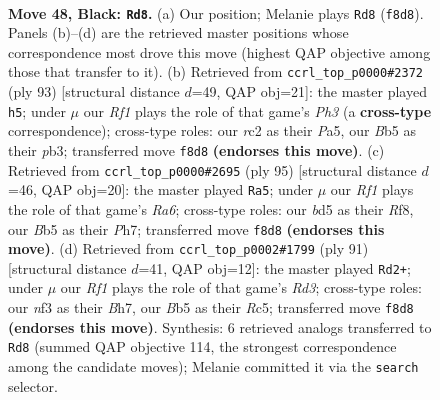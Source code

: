 \documentclass[11pt]{article}
\begin{document}
\clearpage

\begin{figure}[p]\centering
\begin{subfigure}{0.46\textwidth}\centering
\resizebox{\linewidth}{!}{%
\newchessgame
\chessboard[
  setfen={1k3r2/8/8/1b1B1p1N/1P5R/4rN2/2R3P1/3K4 b - - 12 48},
  showmover=false,
  pgfstyle=straightmove, color=movearrow, markmove={f8-d8}
]}
\caption{}
\end{subfigure}\hfill
\begin{subfigure}{0.46\textwidth}\centering
\resizebox{\linewidth}{!}{%
\newchessgame
\chessboard[
  setfen={8/8/6rp/p1P2k2/8/1P1K2b1/P3RN2/8 b - - 1 47},
  showmover=false,
  pgfstyle=straightmove, color=movearrow, markmove={h6-h5}
]}
\caption{}
\end{subfigure}
\\[4pt]
\begin{subfigure}{0.46\textwidth}\centering
\resizebox{\linewidth}{!}{%
\newchessgame
\chessboard[
  setfen={5r1k/7p/4Rb2/7P/5PR1/r7/4N1K1/8 b - - 4 48},
  showmover=false,
  pgfstyle=straightmove, color=movearrow, markmove={a3-a5}
]}
\caption{}
\end{subfigure}\hfill
\begin{subfigure}{0.46\textwidth}\centering
\resizebox{\linewidth}{!}{%
\newchessgame
\chessboard[
  setfen={8/1p3R1b/3r3k/2r5/P3p3/4N1RP/7K/8 b - - 0 46},
  showmover=false,
  pgfstyle=straightmove, color=movearrow, markmove={d6-d2}
]}
\caption{}
\end{subfigure}
\caption{\textbf{Move 48, Black: \texttt{Rd8}.} (a) Our position; Melanie plays \texttt{Rd8} (\texttt{f8d8}). Panels (b)--(d) are the retrieved master positions whose correspondence most drove this move (highest QAP objective among those that transfer to it). (b) Retrieved from \texttt{ccrl\_top\_p0000\#2372} (ply 93) [structural distance $d$=49, QAP obj=21]: the master played \texttt{h5}; under $\mu$ our \emph{Rf1} plays the role of that game's \emph{Ph3} (a \textbf{cross-type} correspondence); cross-type roles: our \emph{r}c2 as their \emph{P}a5, our \emph{B}b5 as their \emph{p}b3; transferred move \texttt{f8d8} \textbf{(endorses this move)}. (c) Retrieved from \texttt{ccrl\_top\_p0000\#2695} (ply 95) [structural distance $d$=46, QAP obj=20]: the master played \texttt{Ra5}; under $\mu$ our \emph{Rf1} plays the role of that game's \emph{Ra6}; cross-type roles: our \emph{b}d5 as their \emph{R}f8, our \emph{B}b5 as their \emph{P}h7; transferred move \texttt{f8d8} \textbf{(endorses this move)}. (d) Retrieved from \texttt{ccrl\_top\_p0002\#1799} (ply 91) [structural distance $d$=41, QAP obj=12]: the master played \texttt{Rd2+}; under $\mu$ our \emph{Rf1} plays the role of that game's \emph{Rd3}; cross-type roles: our \emph{n}f3 as their \emph{B}h7, our \emph{B}b5 as their \emph{R}c5; transferred move \texttt{f8d8} \textbf{(endorses this move)}. Synthesis: 6 retrieved analogs transferred to \texttt{Rd8} (summed QAP objective 114, the strongest correspondence among the candidate moves); Melanie committed it via the \texttt{search} selector.}
\label{fig:thought-m95}
\end{figure}
\end{document}
